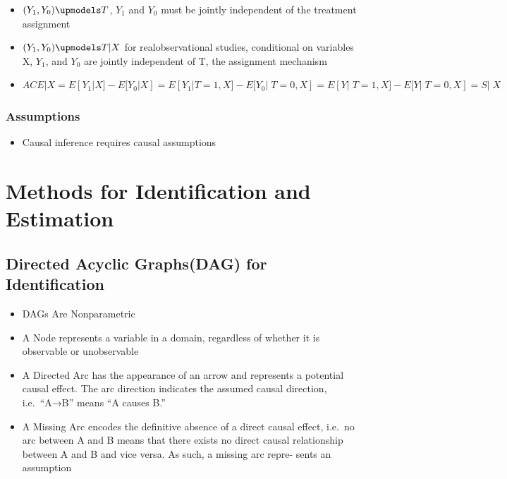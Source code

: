 \documentclass[
]{book}
\providecommand{\tightlist}{%
  \setlength{\itemsep}{0pt}\setlength{\parskip}{0pt}}
\begin{document}
\begin{itemize}
\tightlist
\item
  \((Y_1,Y_0) \upmodels T\), \(Y_1\) and \(Y_0\) must be jointly independent of the treatment assignment
\item
  \((Y_1,Y_0) \upmodels T|X\) for realobservational studies, conditional on variables X, \(Y_1\), and \(Y_0\) are jointly independent of T, the assignment mechanism
\item
  \(ACE|X = E[Y_1|X] - E[Y_0|X] = E[Y_1|T=1,X] - E[Y_0|􏰀T = 0,X] = E[Y|􏰀T = 1,X] - E[Y|􏰀T =0,X] = S|􏰀X\)
\end{itemize}

\hypertarget{assumptions}{%
\subsubsection{Assumptions}\label{assumptions}}

\begin{itemize}
\tightlist
\item
  Causal inference requires causal assumptions
\end{itemize}

\hypertarget{methods-for-identification-and-estimation}{%
\section{Methods for Identification and Estimation}\label{methods-for-identification-and-estimation}}

\hypertarget{directed-acyclic-graphsdag-for-identification}{%
\subsection{Directed Acyclic Graphs(DAG) for Identification}\label{directed-acyclic-graphsdag-for-identification}}

\begin{itemize}
\tightlist
\item
  DAGs Are Nonparametric
\item
  A Node represents a variable in a domain, regardless of whether it is observable or unobservable
\item
  A Directed Arc has the appearance of an arrow and represents a potential causal effect. The arc direction indicates the assumed causal direction, i.e.~``A→B'' means ``A causes B.''
\item
  A Missing Arc encodes the definitive absence of a direct causal effect, i.e.~no arc between A and B means that there exists no direct causal relationship between A and B and vice versa. As such, a missing arc repre- sents an assumption
\end{itemize}
\end{document}
